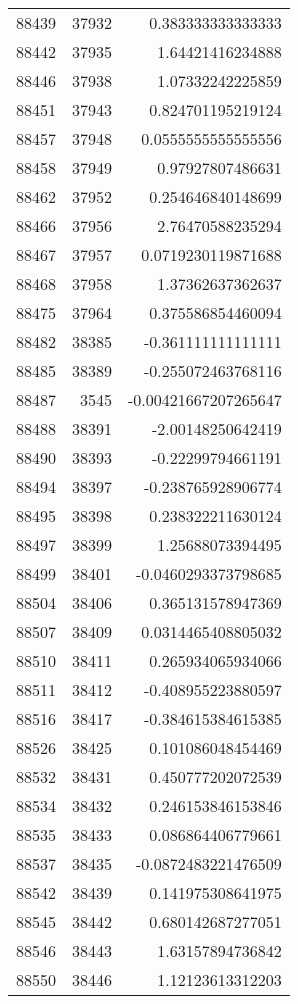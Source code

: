 \begin{tabular}{r | r | r}
88439 & 37932 & 0.383333333333333 \\
88442 & 37935 & 1.64421416234888 \\
88446 & 37938 & 1.07332242225859 \\
88451 & 37943 & 0.824701195219124 \\
88457 & 37948 & 0.0555555555555556 \\
88458 & 37949 & 0.97927807486631 \\
88462 & 37952 & 0.254646840148699 \\
88466 & 37956 & 2.76470588235294 \\
88467 & 37957 & 0.0719230119871688 \\
88468 & 37958 & 1.37362637362637 \\
88475 & 37964 & 0.375586854460094 \\
88482 & 38385 & -0.361111111111111 \\
88485 & 38389 & -0.255072463768116 \\
88487 & 3545 & -0.00421667207265647 \\
88488 & 38391 & -2.00148250642419 \\
88490 & 38393 & -0.22299794661191 \\
88494 & 38397 & -0.238765928906774 \\
88495 & 38398 & 0.238322211630124 \\
88497 & 38399 & 1.25688073394495 \\
88499 & 38401 & -0.0460293373798685 \\
88504 & 38406 & 0.365131578947369 \\
88507 & 38409 & 0.0314465408805032 \\
88510 & 38411 & 0.265934065934066 \\
88511 & 38412 & -0.408955223880597 \\
88516 & 38417 & -0.384615384615385 \\
88526 & 38425 & 0.101086048454469 \\
88532 & 38431 & 0.450777202072539 \\
88534 & 38432 & 0.246153846153846 \\
88535 & 38433 & 0.086864406779661 \\
88537 & 38435 & -0.0872483221476509 \\
88542 & 38439 & 0.141975308641975 \\
88545 & 38442 & 0.680142687277051 \\
88546 & 38443 & 1.63157894736842 \\
88550 & 38446 & 1.12123613312203 \\

\end{tabular}
